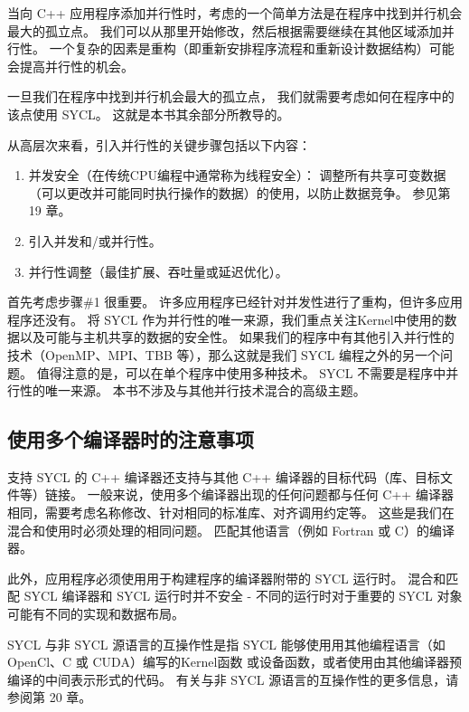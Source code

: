 当向 C++ 应用程序添加并行性时，考虑的一个简单方法是在程序中找到并行机会最大的孤立点。 
我们可以从那里开始修改，然后根据需要继续在其他区域添加并行性。 
一个复杂的因素是重构（即重新安排程序流程和重新设计数据结构）可能会提高并行性的机会。

一旦我们在程序中找到并行机会最大的孤立点，
我们就需要考虑如何在程序中的该点使用 SYCL。 这就是本书其余部分所教导的。

从高层次来看，引入并行性的关键步骤包括以下内容：

\begin{enumerate}
	\item 并发安全（在传统CPU编程中通常称为线程安全）：
	调整所有共享可变数据（可以更改并可能同时执行操作的数据）的使用，以防止数据竞争。 参见第 19 章。

	\item 引入并发和/或并行性。

	\item 并行性调整（最佳扩展、吞吐量或延迟优化）。
\end{enumerate}

首先考虑步骤\#1 很重要。 许多应用程序已经针对并发性进行了重构，但许多应用程序还没有。 
将 SYCL 作为并行性的唯一来源，我们重点关注Kernel中使用的数据以及可能与主机共享的数据的安全性。 
如果我们的程序中有其他引入并行性的技术（OpenMP、MPI、TBB 等），那么这就是我们 SYCL 编程之外的另一个问题。 
值得注意的是，可以在单个程序中使用多种技术。
SYCL 不需要是程序中并行性的唯一来源。 本书不涉及与其他并行技术混合的高级主题。

\subsection{使用多个编译器时的注意事项}
支持 SYCL 的 C++ 编译器还支持与其他 C++ 编译器的目标代码（库、目标文件等）链接。 
一般来说，使用多个编译器出现的任何问题都与任何 C++ 编译器相同，需要考虑名称修改、针对相同的标准库、对齐调用约定等。
这些是我们在混合和使用时必须处理的相同问题。 匹配其他语言（例如 Fortran 或 C）的编译器。

此外，应用程序必须使用用于构建程序的编译器附带的 SYCL 运行时。 
混合和匹配 SYCL 编译器和 SYCL 运行时并不安全 - 不同的运行时对于重要的 SYCL 对象可能有不同的实现和数据布局。

\begin{remark}
	SYCL 与非 SYCL 源语言的互操作性是指 SYCL 能够使用用其他编程语言（如 OpenCl、C 或 CUDA）编写的Kernel函数
	或设备函数，或者使用由其他编译器预编译的中间表示形式的代码。
	有关与非 SYCL 源语言的互操作性的更多信息，请参阅第 20 章。
\end{remark}

